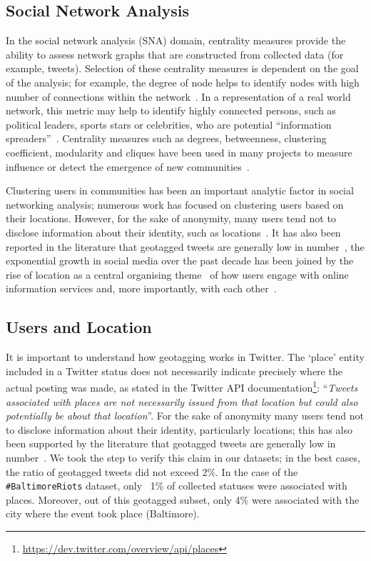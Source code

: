 \subsection{Social Network Analysis}

In the social network analysis (SNA) domain, centrality measures
provide the ability to assess network graphs that are constructed from
collected data (for example, tweets). Selection of these centrality
measures is dependent on the goal of the analysis; for example, the
degree of node helps to identify nodes with high number of connections
within the
network~\cite{borgatti+everett:2000,rombach-et-al:2014,liu-et-al:2014}.
In a representation of a real world network, this metric may help to
identify highly connected persons, such as political leaders, sports
stars or celebrities, who are potential ``information
spreaders''~\cite{cha-et-al:2012,borge-holthoefer-et-al:2012,zhang-et-al:2016}.
Centrality measures such as degrees, betweenness, clustering
coefficient, modularity and cliques have been used in many projects to
measure influence or detect the emergence of new
communities~\cite{willis-et-al:2015,oatley+crick:2015}.

Clustering users in communities has been an important analytic factor
in social networking analysis; numerous work has focused on clustering
users based on their locations. However, for the sake of anonymity,
many users tend not to disclose information about their identity, such
as locations~\cite{kang-et-al:2013}. It has also been reported in the
literature that geotagged tweets are generally low in
number~\cite{morstatter-et-al:2013,tan-et-al:2013,kumar-et-al:2014},
the exponential growth in social media over the past decade has been
joined by the rise of location as a central organising
theme~\cite{liang-et-al:2013} of how users engage with online
information services and, more importantly, with each
other~\cite{cheng-et-al:2010,caverlee-et-al:2013}.

\subsection{Users and Location}

It is important to understand how geotagging works in Twitter. The
`place' entity included in a Twitter status does not necessarily
indicate precisely where the actual posting was made, as stated in the
Twitter API
documentation\footnote{\url{https://dev.twitter.com/overview/api/places}}:
``{\emph{Tweets associated with places are not necessarily issued from
that location but could also potentially be about that location}}''. For
the sake of anonymity many users tend not to disclose information
about their identity, particularly locations; this has also been
supported by the literature that geotagged tweets are generally low in
number~\cite{kang-et-al:2013}. We took the step to verify this claim
in our datasets; in the best cases, the ratio of geotagged tweets did
not exceed 2\%. In the case of the {\texttt{\#BaltimoreRiots}}
dataset, only ~1\% of collected statuses were associated with
places. Moreover, out of this geotagged subset, only 4\% were
associated with the city where the event took place (Baltimore).

